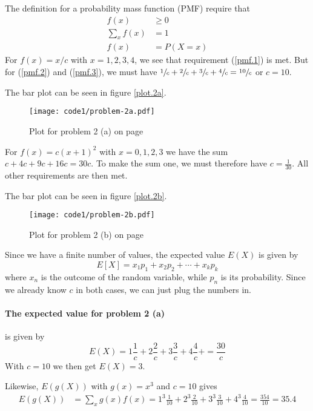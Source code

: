 \documentclass[a4paper,english,12pt]{article}
\begin{document}
The definition for a probability mass function (PMF) require that
\begin{align}
  f(x) &\geqslant 0 \label{pmf.1} \\
  \sum_x{f(x)} &= 1 \label{pmf.2} \\
  f(x) &= P(X=x) \label{pmf.3}
\end{align}
For $f(x) = x/c$ with $x=1,2,3,4$, we see that requirement (\ref{pmf.1}) is met.
But for (\ref{pmf.2}) and (\ref{pmf.3}), we must have
$\sfrac{1}{c} + \sfrac{2}{c} + \sfrac{3}{c} + \sfrac{4}{c} = \sfrac{10}{c}$
or $c=10$.

The bar plot can be seen in figure \vref{plot.2a}.

\begin{figure}[h]
  \texttt{[image: code1/problem-2a.pdf]}
  \caption{Plot for problem 2 (a) on page \pageref{problem.2 (a)}}
  \label{plot.2a}
\end{figure}

For $f(x) = c(x+1)^2$ with $x=0,1,2,3$ we have the sum $c+4c+9c+16c=30c$.  To
make the sum one, we must therefore have $c=\frac{1}{30}$. All other
requirements are then met.

The bar plot can be seen in figure \vref{plot.2b}.

\begin{figure}[h]
  \texttt{[image: code1/problem-2b.pdf]}
  \caption{Plot for problem 2 (b) on page \pageref{problem.2 (b)}}
  \label{plot.2b}
\end{figure}

Since we have a finite number of values, the expected value $E(X)$ is given by
\[
  E[X] = x_1p_1 + x_2p_2 + \cdots + x_kp_k
\]
where $x_n$ is the outcome of the random variable, while $p_n$ is its
probability. Since we already know $c$ in both cases, we can just plug the
numbers in.

\paragraph{The expected value for problem 2 (a)} is given by
\[
  E(X) =
      1\frac{1}{c} +
      2\frac{2}{c} +
      3\frac{3}{c} +
      4\frac{4}{c} +
      = \frac{30}{c}
\]
With $c=10$ we then get $E(X) = 3$.

Likewise, $E(g(X))$ with $g(x)=x^3$ and $c=10$ gives
\begin{align*}
  E(g(X)) &= \sum_x{g(x)f(x)} =
    1^3\frac{1}{10} +
    2^3\frac{2}{10} +
    3^3\frac{3}{10} +
    4^3\frac{4}{10} =
    \frac{354}{10} = 35.4
\end{align*}
\end{document}
